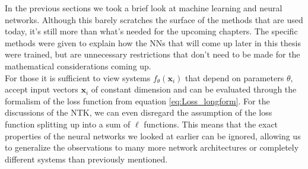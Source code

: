 In the previous sections we took a brief look at machine learning and neural networks. Although this barely scratches the surface of the methods that are used today, it's still more than what's needed for the upcoming chapters. The specific methods were given to explain how the NNs that will come up later in this thesis were trained, but are unnecessary restrictions that don't need to be made for the mathematical considerations coming up.\\
For those it is sufficient to view systems $f_\theta(\mathbf{x}_i)$ that depend on parameters $\theta$, accept input vectors $\mathbf{x}_i$ of constant dimension and can be evaluated through the formalism of the loss function from equation \cref{eq:Loss_longform}. For the discussions of the NTK, we can even disregard the assumption of the loss function splitting up into a sum of $\ell$ functions. This means that the exact properties of the neural networks we looked at earlier can be ignored, allowing us to generalize the observations to many more network architectures or completely different systems than previously mentioned.